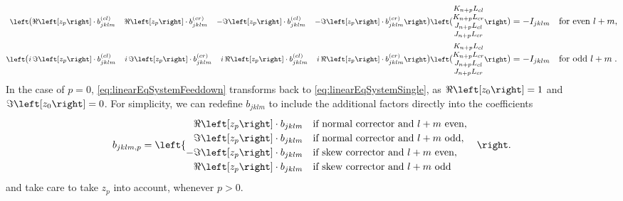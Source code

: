 \begin{equation}
    \label{eq:linearEqSystemFeeddown}
    \begin{split}
    \footnotesize
    \begin{pmatrix}
        \ReOf{z_p} \cdot b_{jklm}^{(cl)} & 
        \ReOf{z_p} \cdot b_{jklm}^{(cr)} & 
        -\ImOf{z_p} \cdot b_{jklm}^{(cl)} &
        -\ImOf{z_p} \cdot b_{jklm}^{(cr)}
    \end{pmatrix}
    \begin{pmatrix}
        K_{n+p}L_{cl} \\ 
        K_{n+p}L_{cr} \\ 
        J_{n+p}L_{cl} \\ 
        J_{n+p}L_{cr}
    \end{pmatrix}
     &= -
     I_{jklm} \quad
    \text{for even } l+m, 
     \\
    \footnotesize
    \begin{pmatrix}
        i \,\ImOf{z_p} \cdot b_{jklm}^{(cl)} & 
        i \,\ImOf{z_p} \cdot b_{jklm}^{(cr)} & 
        i \,\ReOf{z_p} \cdot b_{jklm}^{(cl)} & 
        i \,\ReOf{z_p} \cdot b_{jklm}^{(cr)}
    \end{pmatrix}
    \begin{pmatrix}
        K_{n+p}L_{cl} \\ 
        K_{n+p}L_{cr} \\ 
        J_{n+p}L_{cl} \\
        J_{n+p}L_{cr}
    \end{pmatrix}
     &=  
     -I_{jklm} \quad
    \text{for odd } l+m \; .
    \end{split}
\end{equation}
%
In the case of $p = 0$, \cref{eq:linearEqSystemFeeddown} transforms back to \cref{eq:linearEqSystemSingle},
as $\ReOf{z_0} = 1$ and $\ImOf{z_0} = 0$. 
For simplicity, we can redefine $b_{jklm}$ to include the additional factors directly into the coefficients 
\begin{equation}
    \label{eq:coefficientWithFeeddown}
    b_{jklm,p} =
    \begin{cases}
      \phantom{-} \ReOf{z_p} \cdot b_{jklm}   \quad \text{if normal corrector and } l + m \text{ even}, \\
     \phantom{-} \ImOf{z_p} \cdot b_{jklm}    \quad \text{if normal corrector and } l + m \text{ odd}, \\    
      -\ImOf{z_p} \cdot b_{jklm}              \quad \text{if skew corrector and } l + m \text{ even}, \\    
       \phantom{-} \ReOf{z_p}  \cdot b_{jklm} \quad \text{if skew corrector and } l + m \text{ odd} 
    \end{cases}
\end{equation}
%
and take care to take $z_p$ into account, whenever $p>0$.

